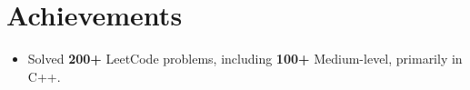\documentclass[10pt,letterpaper]{article}
\begin{document}
\section{Achievements}
\begin{itemize}
  \item Solved \textbf{200+} LeetCode problems, including \textbf{100+} Medium-level, primarily in C++.
\end{itemize}
\end{document}
